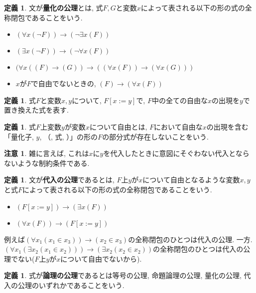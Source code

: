 \documentclass[a4paper]{bxjsarticle}
\theoremstyle{definition}
\newtheorem{defn}[thm]{定義}
\newtheorem{rem}[thm]{注意}
\begin{document}
    \begin{defn}
        文が\textbf{量化の公理}とは, 式$F, G$と変数$x$によって表される以下の形の式の全称閉包であることをいう.
        \begin{itemize}
            \item $(\forall x (\lnot F)) \to (\lnot \exists x (F))$
            \item $(\exists x (\lnot F)) \to (\lnot \forall x (F))$
            \item $(\forall x ((F) \to (G)) \to ((\forall x (F)) \to (\forall x (G)))$
            \item $x$が$F$で自由でないときの, $(F) \to (\forall x (F))$
        \end{itemize}
    \end{defn}
    \begin{defn}
        式$F$と変数$x, y$について, $F[x := y]$で, $F$中の全ての自由な$x$の出現を$y$で置き換えた式を表す.
    \end{defn}
    \begin{defn}
        式$F$上変数$y$が変数$x$について自由とは, $F$において自由な$x$の出現を含む「量化子, $y$, （, 式, ）」の形の$F$の部分式が存在しないことをいう.
    \end{defn}
    \begin{rem}
        雑に言えば, これは$x$に$y$を代入したときに意図にそぐわない代入とならないような制約条件である.
    \end{rem}
    \begin{defn}
        文が\textbf{代入の公理}であるとは, $F$上$y$が$x$について自由となるような変数$x,y$と式$F$によって表される以下の形の式の全称閉包であることをいう.
        \begin{itemize}
            \item $(F[x := y]) \to (\exists x (F))$
            \item $(\forall x (F)) \to (F[x := y])$
        \end{itemize}
        
        例えば$(\forall x_1 (x_1 \in x_3)) \to (x_2 \in x_3)$の全称閉包のひとつは代入の公理. 一方. $(\forall x_1 (\exists x_2 (x_1 \in x_2))) \to (\exists x_2 (x_2 \in x_2))$の全称閉包のひとつは代入の公理でない($F$上$y$が$x$について自由でないから).
    \end{defn}
    \begin{defn}
        式が\textbf{論理の公理}であるとは等号の公理, 命題論理の公理, 量化の公理, 代入の公理のいずれかであることをいう.
    \end{defn}
    
\end{document}
